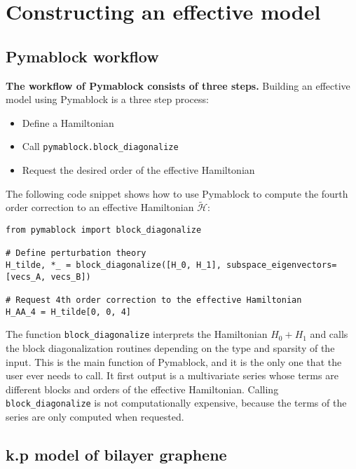 \section{Constructing an effective model}
\subsection{Pymablock workflow}

\textbf{The workflow of Pymablock consists of three steps.}
Building an effective model using Pymablock is a three step process:

\begin{itemize}
\item Define a Hamiltonian
\item Call \texttt{pymablock.block\_diagonalize}
\item Request the desired order of the effective Hamiltonian
\end{itemize}

The following code snippet shows how to use Pymablock to compute the fourth
order correction to an effective Hamiltonian $\tilde{\mathcal{H}}$:

\begin{verbatim}
from pymablock import block_diagonalize

# Define perturbation theory
H_tilde, *_ = block_diagonalize([H_0, H_1], subspace_eigenvectors=[vecs_A, vecs_B])

# Request 4th order correction to the effective Hamiltonian
H_AA_4 = H_tilde[0, 0, 4]
\end{verbatim}


The function \texttt{block\_diagonalize} interprets the Hamiltonian $H_0 +
H_1$ and calls the block diagonalization routines depending on the
type and sparsity of the input.
This is the main function of Pymablock, and it is the only one that the user
ever needs to call.
It first output is a multivariate series whose terms are different blocks and
orders of the effective Hamiltonian.
Calling \texttt{block\_diagonalize} is not computationally expensive, because the
terms of the series are only computed when requested.

\subsection{k.p model of bilayer graphene}

